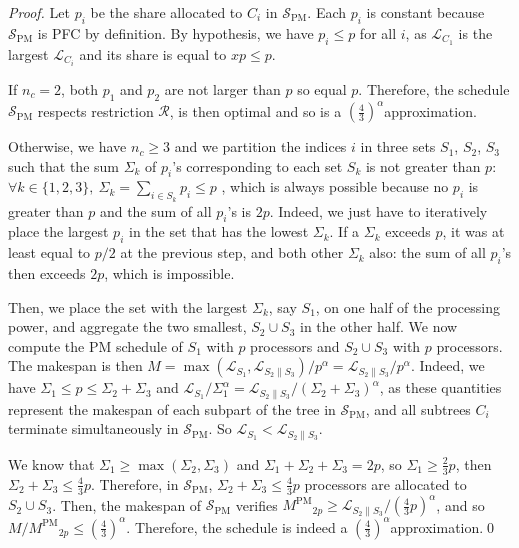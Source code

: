 \documentclass{llncs}
\newcommand{\LG}[1]{\mathcal{L}_{#1}}
\newcommand{\para}[2]{#1 \mathop{\parallel} #2}
\newcommand{\spm}{\ensuremath{\mathcal{S}_{\mathrm{PM}}}\xspace}
\newcommand{\mpm}{\ensuremath{M^{\mathrm{PM}}}\xspace}
\newcommand{\R}{\ensuremath{\mathcal{R}}\xspace}
\newcommand{\frtrd}{\ensuremath{\left(\frac{4}{3}\right)^\alpha}}
\begin{document}
\begin{proof}

Let $p_i$ be the share allocated to $C_i$ in \spm. Each $p_i$ is constant because $\spm$ is PFC by definition. By hypothesis, we have $p_i\leq p$ for all $i$, as $\LG{C_1}$ is the largest $\LG{C_i}$ and its share is equal to $xp \leq p$.

 If $n_c=2$, both $p_1$ and $p_2$ are not larger than $p$ so equal $p$. Therefore, the schedule $\spm$ respects restriction $\R$, is then optimal and so is a \frtrd approximation. 
 
 Otherwise, we have $n_c\geq 3$ and we partition the indices $i$ in three sets $S_1$, $S_2$, $S_3$ such that the sum $\Sigma_k$ of $p_i$'s corresponding to each set $S_k$ is not greater than $p$:
$ \forall k \in \{1,2,3\},\ \Sigma_k = \sum_{i \in S_k} p_i \leq p$
 , which is always possible because no $p_i$ is greater than $p$ and the sum of all $p_i$'s is $2p$. Indeed, we just have to iteratively place the largest $p_i$ in the set that has the lowest $\Sigma_k$. If a $\Sigma_k$ exceeds $p$, it was at least equal to $p/2$ at the previous step, and both other $\Sigma_k$ also: the sum of all $p_i$'s then exceeds $2p$, which is impossible.
 
 Then, we place the set with the largest $\Sigma_k$, say $S_1$, on one half of the processing power, and aggregate the two smallest, $S_2\cup S_3$ in the other half. We now compute the PM schedule of $S_1$ with $p$ processors and $S_2\cup S_3$ with $p$ processors. The makespan is then $M = \max{\left(\LG{S_1},\LG{\para{S_2}{S_3}}\right)}\big/p^\alpha= \LG{\para{S_2}{S_3}}\big/p^\alpha$.
  Indeed, we have $\Sigma_1 \leq p \leq \Sigma_2+\Sigma_3$ and $\LG{S_1}\big/\Sigma_1^\alpha = \LG{\para{S_2}{S_3}}\big/(\Sigma_2+\Sigma_3)^\alpha$, as these quantities represent the makespan of each subpart of the tree in $\spm$, and all subtrees $C_i$ terminate simultaneously in \spm.  So $\LG{S_1}<\LG{\para{S_2}{S_3}}$.
  
  
 We know that $\Sigma_1 \geq \max\left(\Sigma_2,\Sigma_3\right)$ and $\Sigma_1+\Sigma_2+\Sigma_3 =2p$, so $\Sigma_1\geq \frac 23p$, then $\Sigma_2+\Sigma_3\leq \frac 43 p$.
Therefore, in $\spm$, $\Sigma_2+\Sigma_3 \leq \frac 43p$ processors are allocated to $S_2\cup S_3$.
Then, the makespan of $\spm$ verifies $\mpm_{2p} \geq \LG{\para{S_2}{S_3}} \big/ \left( \frac 43 p \right)^\alpha$, and so $M/\mpm_{2p} \leq \frtrd$. Therefore, the schedule is indeed a \frtrd approximation.\qed
\end{proof} 
\end{document}
